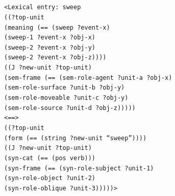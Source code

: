 \\
\\
{\tt <Lexical entry: sweep
\\ ((?top-unit
\\ \hspace*{5mm} (meaning (== (sweep ?event-x)
\\ \hspace*{32mm}(sweep-1 ?event-x ?obj-x)
\\ \hspace*{32mm}(sweep-2 ?event-x ?obj-y)
\\ \hspace*{32mm}(sweep-2 ?event-x ?obj-z))))
\\ \hspace*{2mm}((J ?new-unit ?top-unit)
\\ \hspace*{5mm} (sem-frame (== (sem-role-agent ?unit-a ?obj-x)
\\ \hspace*{36mm}(sem-role-surface ?unit-b ?obj-y)
\\ \hspace*{36mm}(sem-role-moveable ?unit-c ?obj-y)
\\ \hspace*{36mm}(sem-role-source ?unit-d ?obj-z)))))
\\ <==>
\\ ((?top-unit
\\ \hspace*{5mm} (form (== (string ?new-unit ``sweep''))))
\\ \hspace*{2mm}((J ?new-unit ?top-unit)
\\ \hspace*{5mm} (syn-cat (== (pos verb)))
\\ \hspace*{5mm} (syn-frame (== (syn-role-subject ?unit-1)
\\ \hspace*{36mm}(syn-role-object ?unit-2)
\\ \hspace*{36mm}(syn-role-oblique ?unit-3)))))>}
\\
\\
